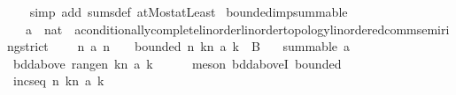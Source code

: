 \begin{isabellebody}
%
\isadelimproof
\ \ %
\endisadelimproof
%
\isatagproof
{}\isamarkupfalse%
\ {\isacharparenleft}{\kern0pt}simp\ add{\isacharcolon}{\kern0pt}\ sums{\isacharunderscore}{\kern0pt}def{\isacharprime}{\kern0pt}\ atMost{\isacharunderscore}{\kern0pt}atLeast{}{\isacharparenright}{\kern0pt}%
\endisatagproof
{\isafoldproof}%
%
\isadelimproof
\isanewline
%
\endisadelimproof
\isanewline
{}\isamarkupfalse%
\ bounded{\isacharunderscore}{\kern0pt}imp{\isacharunderscore}{\kern0pt}summable{\isacharcolon}{\kern0pt}\isanewline
\ \ \ a\ {\isacharcolon}{\kern0pt}{\isacharcolon}{\kern0pt}\ {\isachardoublequoteopen}nat\ {\isasymRightarrow}\ {\isacharprime}{\kern0pt}a{\isacharcolon}{\kern0pt}{\isacharcolon}{\kern0pt}{\isacharbraceleft}{\kern0pt}conditionally{\isacharunderscore}{\kern0pt}complete{\isacharunderscore}{\kern0pt}linorder{\isacharcomma}{\kern0pt}linorder{\isacharunderscore}{\kern0pt}topology{\isacharcomma}{\kern0pt}linordered{\isacharunderscore}{\kern0pt}comm{\isacharunderscore}{\kern0pt}semiring{\isacharunderscore}{\kern0pt}strict{\isacharbraceright}{\kern0pt}{\isachardoublequoteclose}\isanewline
\ \ \ {}{\isacharcolon}{\kern0pt}\ {\isachardoublequoteopen}{\isasymAnd}n{\isachardot}{\kern0pt}\ a\ n\ {\isasymge}\ {}{\isachardoublequoteclose}\ \ bounded{\isacharcolon}{\kern0pt}\ {\isachardoublequoteopen}{\isasymAnd}n{\isachardot}{\kern0pt}\ {\isacharparenleft}{\kern0pt}{\isasymSum}k{\isasymle}n{\isachardot}{\kern0pt}\ a\ k{\isacharparenright}{\kern0pt}\ {\isasymle}\ B{\isachardoublequoteclose}\isanewline
\ \ \ {\isachardoublequoteopen}summable\ a{\isachardoublequoteclose}\ \isanewline
%
\isadelimproof
%
\endisadelimproof
%
\isatagproof
{}\isamarkupfalse%
\ {\isacharminus}{\kern0pt}\isanewline
\ \ \isamarkupfalse%
\ {\isachardoublequoteopen}bdd{\isacharunderscore}{\kern0pt}above\ {\isacharparenleft}{\kern0pt}range{\isacharparenleft}{\kern0pt}{\isasymlambda}n{\isachardot}{\kern0pt}\ {\isasymSum}k{\isasymle}n{\isachardot}{\kern0pt}\ a\ k{\isacharparenright}{\kern0pt}{\isacharparenright}{\kern0pt}{\isachardoublequoteclose}\isanewline
\ \ \ \ \isamarkupfalse%
\ {\isacharparenleft}{\kern0pt}meson\ bdd{\isacharunderscore}{\kern0pt}aboveI{}\ bounded{\isacharparenright}{\kern0pt}\isanewline
\ \ \isamarkupfalse%
\ \isamarkupfalse%
\ {\isachardoublequoteopen}incseq\ {\isacharparenleft}{\kern0pt}{\isasymlambda}n{\isachardot}{\kern0pt}\ {\isasymSum}k{\isasymle}n{\isachardot}{\kern0pt}\ a\ k{\isacharparenright}{\kern0pt}{\isachardoublequoteclose}\isanewline

\end{isabellebody}
